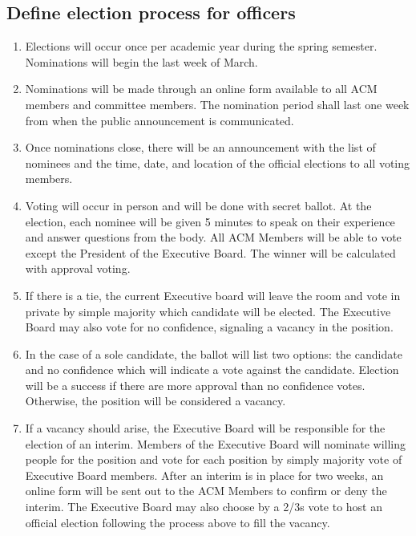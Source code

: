 \subsection{Define election process for officers}
\begin{enumerate}
  \item Elections will occur once per academic year during the spring semester.
    Nominations will begin the last week of March.
  \item Nominations will be made through an online form available to all ACM
    members and committee members. The nomination period shall last one week
    from when the public announcement is communicated.
  \item Once nominations close, there will be an announcement with the list of
    nominees and the time, date, and location of the official elections to all
    voting members.
  \item Voting will occur in person and will be done with secret ballot. At the
    election, each nominee will be given 5 minutes to speak on their experience
    and answer questions from the body. All ACM Members will be able to vote except
    the President of the Executive Board. The winner will be calculated with
    approval voting.
  \item If there is a tie, the current Executive board will leave the room and
    vote in private by simple majority which candidate will be elected. The
    Executive Board may also vote for no confidence, signaling a vacancy in the
    position.
  \item In the case of a sole candidate, the ballot will list two options: the
    candidate and no confidence which will indicate a vote against the
    candidate. Election will be a success if there are more approval than no
    confidence votes. Otherwise, the position will be considered a vacancy.
  \item If a vacancy should arise, the Executive Board will be responsible for
    the election of an interim. Members of the Executive Board will nominate
    willing people for the position and vote for each position by simply
    majority vote of Executive Board members. After an interim is in place for
    two weeks, an online form will be sent out to the ACM Members to confirm or
    deny the interim. The Executive Board may also choose by a 2/3s vote to host
    an official election following the process above to fill the vacancy.
\end{enumerate}

